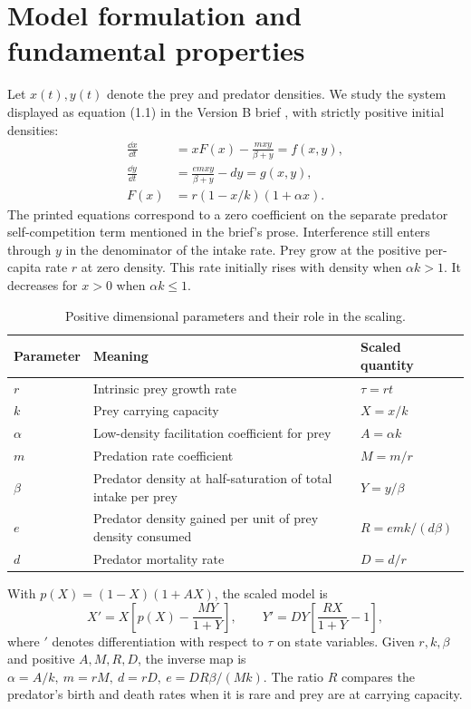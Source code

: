 \section{Model formulation and fundamental properties}\label{sec:model}
Let \(x(t),y(t)\) denote the prey and predator densities. We study the system displayed as equation (1.1) in the Version B brief \citep{brief}, with strictly positive initial densities:
\begin{equation}\label{eq:ode}
 \begin{aligned}
 \frac{\dd x}{\dd t}&=xF(x)-\frac{mxy}{\beta+y}=f(x,y),\\
 \frac{\dd y}{\dd t}&=\frac{emxy}{\beta+y}-dy=g(x,y),\\
 F(x)&=r(1-x/k)(1+\alpha x).
 \end{aligned}
\end{equation}
The printed equations correspond to a zero coefficient on the separate predator self-competition term mentioned in the brief's prose. Interference still enters through \(y\) in the denominator of the intake rate. Prey grow at the positive per-capita rate \(r\) at zero density. This rate initially rises with density when \(\alpha k>1\). It decreases for \(x>0\) when \(\alpha k\le 1\).

\begin{table}[tbp]\centering
\caption{Positive dimensional parameters and their role in the scaling.}\label{tab:param}
\begin{tabularx}{\linewidth}{@{}lYl@{}}\toprule
Parameter & Meaning & Scaled quantity \\ \midrule
\(r\) & Intrinsic prey growth rate & \(\tau=rt\) \\
\(k\) & Prey carrying capacity & \(X=x/k\) \\
\(\alpha\) & Low-density facilitation coefficient for prey & \(A=\alpha k\) \\
\(m\) & Predation rate coefficient & \(M=m/r\) \\
\(\beta\) & Predator density at half-saturation of total intake per prey & \(Y=y/\beta\) \\
\(e\) & Predator density gained per unit of prey density consumed & \(R=emk/(d\beta)\) \\
\(d\) & Predator mortality rate & \(D=d/r\) \\
\bottomrule\end{tabularx}
\end{table}

With \(p(X)=(1-X)(1+AX)\), the scaled model is
\begin{equation}\label{eq:scaled}
 X'=X\left[p(X)-\frac{MY}{1+Y}\right],\qquad
 Y'=DY\left[\frac{RX}{1+Y}-1\right],
\end{equation}
where \( '\) denotes differentiation with respect to \(\tau\) on state variables. Given \(r,k,\beta\) and positive \(A,M,R,D\), the inverse map is
\(\alpha=A/k,\ m=rM,\ d=rD,\ e=DR\beta/(Mk)\).
The ratio \(R\) compares the predator's birth and death rates when it is rare and prey are at carrying capacity.

